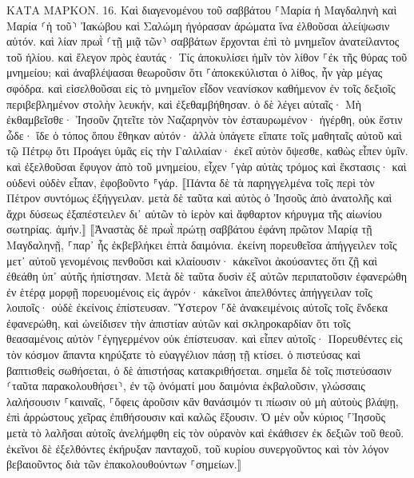 \documentclass[twoside, 9pt]{extreport}
\begin{document}
ΚΑΤΑ ΜΑΡΚΟΝ.
16.
Καὶ διαγενομένου τοῦ σαββάτου ⸀Μαρία ἡ Μαγδαληνὴ καὶ Μαρία ⸂ἡ τοῦ⸃ Ἰακώβου καὶ Σαλώμη ἠγόρασαν ἀρώματα ἵνα ἐλθοῦσαι ἀλείψωσιν αὐτόν. 
καὶ λίαν πρωῒ ⸂τῇ μιᾷ τῶν⸃ σαββάτων ἔρχονται ἐπὶ τὸ μνημεῖον ἀνατείλαντος τοῦ ἡλίου. 
καὶ ἔλεγον πρὸς ἑαυτάς· Τίς ἀποκυλίσει ἡμῖν τὸν λίθον ⸀ἐκ τῆς θύρας τοῦ μνημείου; 
καὶ ἀναβλέψασαι θεωροῦσιν ὅτι ⸀ἀποκεκύλισται ὁ λίθος, ἦν γὰρ μέγας σφόδρα. 
καὶ εἰσελθοῦσαι εἰς τὸ μνημεῖον εἶδον νεανίσκον καθήμενον ἐν τοῖς δεξιοῖς περιβεβλημένον στολὴν λευκήν, καὶ ἐξεθαμβήθησαν. 
ὁ δὲ λέγει αὐταῖς· Μὴ ἐκθαμβεῖσθε· Ἰησοῦν ζητεῖτε τὸν Ναζαρηνὸν τὸν ἐσταυρωμένον· ἠγέρθη, οὐκ ἔστιν ὧδε· ἴδε ὁ τόπος ὅπου ἔθηκαν αὐτόν· 
ἀλλὰ ὑπάγετε εἴπατε τοῖς μαθηταῖς αὐτοῦ καὶ τῷ Πέτρῳ ὅτι Προάγει ὑμᾶς εἰς τὴν Γαλιλαίαν· ἐκεῖ αὐτὸν ὄψεσθε, καθὼς εἶπεν ὑμῖν. 
καὶ ἐξελθοῦσαι ἔφυγον ἀπὸ τοῦ μνημείου, εἶχεν ⸀γὰρ αὐτὰς τρόμος καὶ ἔκστασις· καὶ οὐδενὶ οὐδὲν εἶπαν, ἐφοβοῦντο ⸁γάρ. ⟦Πάντα δὲ τὰ παρηγγελμένα τοῖς περὶ τὸν Πέτρον συντόμως ἐξήγγειλαν. μετὰ δὲ ταῦτα καὶ αὐτὸς ὁ Ἰησοῦς ἀπὸ ἀνατολῆς καὶ ἄχρι δύσεως ἐξαπέστειλεν δι᾽ αὐτῶν τὸ ἱερὸν καὶ ἄφθαρτον κήρυγμα τῆς αἰωνίου σωτηρίας. ἀμήν.⟧ 
⟦Ἀναστὰς δὲ πρωῒ πρώτῃ σαββάτου ἐφάνη πρῶτον Μαρίᾳ τῇ Μαγδαληνῇ, ⸀παρ᾽ ἧς ἐκβεβλήκει ἑπτὰ δαιμόνια. 
ἐκείνη πορευθεῖσα ἀπήγγειλεν τοῖς μετ᾽ αὐτοῦ γενομένοις πενθοῦσι καὶ κλαίουσιν· 
κἀκεῖνοι ἀκούσαντες ὅτι ζῇ καὶ ἐθεάθη ὑπ᾽ αὐτῆς ἠπίστησαν. 
Μετὰ δὲ ταῦτα δυσὶν ἐξ αὐτῶν περιπατοῦσιν ἐφανερώθη ἐν ἑτέρᾳ μορφῇ πορευομένοις εἰς ἀγρόν· 
κἀκεῖνοι ἀπελθόντες ἀπήγγειλαν τοῖς λοιποῖς· οὐδὲ ἐκείνοις ἐπίστευσαν. 
Ὕστερον ⸀δὲ ἀνακειμένοις αὐτοῖς τοῖς ἕνδεκα ἐφανερώθη, καὶ ὠνείδισεν τὴν ἀπιστίαν αὐτῶν καὶ σκληροκαρδίαν ὅτι τοῖς θεασαμένοις αὐτὸν ⸀ἐγηγερμένον οὐκ ἐπίστευσαν. 
καὶ εἶπεν αὐτοῖς· Πορευθέντες εἰς τὸν κόσμον ἅπαντα κηρύξατε τὸ εὐαγγέλιον πάσῃ τῇ κτίσει. 
ὁ πιστεύσας καὶ βαπτισθεὶς σωθήσεται, ὁ δὲ ἀπιστήσας κατακριθήσεται. 
σημεῖα δὲ τοῖς πιστεύσασιν ⸂ταῦτα παρακολουθήσει⸃, ἐν τῷ ὀνόματί μου δαιμόνια ἐκβαλοῦσιν, γλώσσαις λαλήσουσιν ⸀καιναῖς, 
⸀ὄφεις ἀροῦσιν κἂν θανάσιμόν τι πίωσιν οὐ μὴ αὐτοὺς βλάψῃ, ἐπὶ ἀρρώστους χεῖρας ἐπιθήσουσιν καὶ καλῶς ἕξουσιν. 
Ὁ μὲν οὖν κύριος ⸀Ἰησοῦς μετὰ τὸ λαλῆσαι αὐτοῖς ἀνελήμφθη εἰς τὸν οὐρανὸν καὶ ἐκάθισεν ἐκ δεξιῶν τοῦ θεοῦ. 
ἐκεῖνοι δὲ ἐξελθόντες ἐκήρυξαν πανταχοῦ, τοῦ κυρίου συνεργοῦντος καὶ τὸν λόγον βεβαιοῦντος διὰ τῶν ἐπακολουθούντων ⸀σημείων.⟧ 
\end{document}
